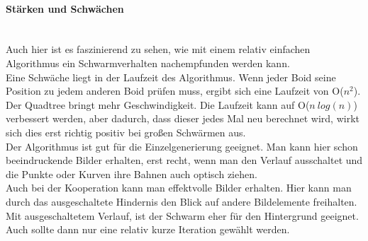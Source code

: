 \documentclass[../mciAusarbeitung.tex]{subfiles}
\begin{document}
		\paragraph{Stärken und Schwächen}$~$\\
		Auch hier ist es faszinierend zu sehen, wie mit einem relativ einfachen Algorithmus ein Schwarmverhalten nachempfunden werden kann.\\
		Eine Schwäche liegt in der Laufzeit des Algorithmus. Wenn jeder Boid seine Position zu jedem anderen Boid prüfen muss, ergibt sich eine Laufzeit von O($ n^2 $). Der Quadtree bringt mehr Geschwindigkeit. Die Laufzeit kann auf O($ n \: log(n) $) verbessert werden, aber dadurch, dass dieser jedes Mal neu berechnet wird, wirkt sich dies erst richtig positiv bei großen Schwärmen aus.\\
		Der Algorithmus ist gut für die Einzelgenerierung geeignet. Man kann hier schon beeindruckende Bilder erhalten, erst recht, wenn man den Verlauf ausschaltet und die Punkte oder Kurven ihre Bahnen auch optisch ziehen.\\
		Auch bei der Kooperation kann man effektvolle Bilder erhalten. Hier kann man durch das ausgeschaltete Hindernis den Blick auf andere Bildelemente freihalten. Mit ausgeschaltetem Verlauf, ist der Schwarm eher für den Hintergrund geeignet. Auch sollte dann nur eine relativ kurze Iteration gewählt werden.\\
		
\end{document}
